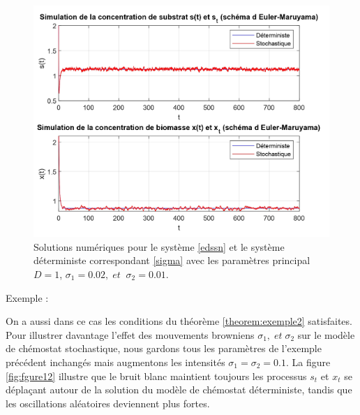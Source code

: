 \documentclass[12pt,a4paper]{report}%
\newcounter{PP}[chapter]
\newenvironment{exemple}[2][]
  {\refstepcounter{PP}
  \begin{bclogo}[
    logo=\bccrayon , %
    couleur=white,
    arrondi=0.1,
    barre =snake,
     tailleOndu = 1.5,
    couleurBord=white,#1]{Exemple \thePP:#2}
  }
  {\end{bclogo}}
\begin{document}
\begin{figure}[h]
	\centering
	\includegraphics[width=1.05\textwidth]{c1_page-0001.png} 
	\caption{Solutions numériques pour le système \eqref{edssn} et le système déterministe correspondant \eqref{sigma} avec les paramètres principal \( D = 1 \), $\sigma_1=0.02 , \;et \;\; \sigma_2 = 0.01$.}
	\label{fig:fgure11}
\end{figure}
\newpage
\begin{exemple}{}
	On a aussi dans ce cas les conditions du théorème \ref{theorem:exemple2} satisfaites. Pour illustrer davantage l’effet des mouvements browniens \(\sigma_1, \; et\; \sigma_2\) sur le modèle de chémostat stochastique, nous gardons tous les paramètres de l’exemple précédent inchangés mais augmentons les intensités  \(\sigma_1=\sigma_2 = 0.1\). La figure \ref{fig:fgure12} illustre que le bruit blanc maintient toujours les processus \(s_t\) et \(x_t\) se déplaçant autour de la solution du modèle de chémostat déterministe, tandis que les oscillations aléatoires deviennent plus fortes.
	
\end{exemple}
\end{document}
